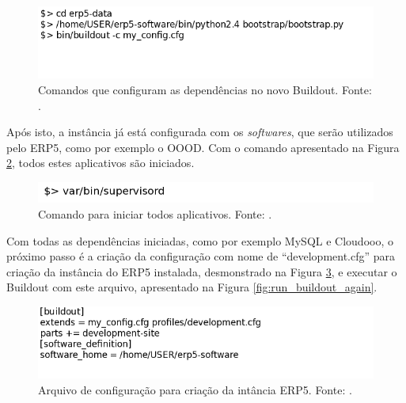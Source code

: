 \begin{figure}[!ht]
\centering
\begin{center}
\includegraphics[scale=0.660,bb=0 90 610 120]{run_minha_instancia.png}
\end{center}
\caption{Comandos que configuram as dependências no novo Buildout. Fonte: \cite{erp5_buildout}.}
\label{fig:run_base_instance}
\end{figure}

Após isto, a instância já está configurada com os \textit{softwares}, que serão utilizados pelo ERP5, como por exemplo o OOOD. Com o comando apresentado na Figura \ref{fig:supervisor}, todos estes aplicativos são iniciados.

\begin{figure}[!ht]
\centering
\begin{center}
\includegraphics[scale=0.660,bb=0 30 410 5]{erp5_supervidor.png}
\end{center}
\caption{Comando para iniciar todos aplicativos. Fonte: \cite{erp5_buildout}.}
\label{fig:supervisor}
\end{figure}

Com todas as dependências iniciadas, como por exemplo MySQL e Cloudooo, o próximo passo é a criação da configuração com nome de ``development.cfg'' para criação da instância do ERP5 instalada, desmonstrado na Figura \ref{fig:erp5_site}, e executar o Buildout com este arquivo, apresentado na Figura \ref{fig:run_buildout_again}.

\begin{figure}[ht]
\centering
\begin{center}
\includegraphics[scale=0.660,bb=50 50 410 120]{instancia.png}
\end{center}
\caption{Arquivo de configuração para criação da intância ERP5. Fonte: \cite{erp5_buildout}.}
\label{fig:erp5_site}
\end{figure}

